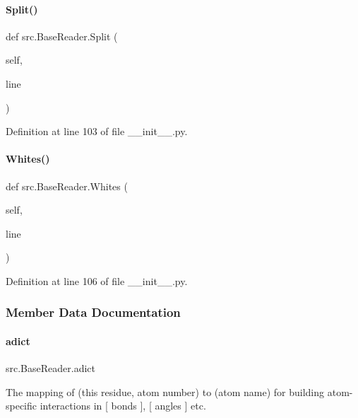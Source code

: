 \paragraph{\texorpdfstring{Split()}{Split()}}
{\footnotesize\ttfamily def src.\+Base\+Reader.\+Split (\begin{DoxyParamCaption}\item[{}]{self,  }\item[{}]{line }\end{DoxyParamCaption})}



Definition at line 103 of file \+\_\+\+\_\+init\+\_\+\+\_\+.\+py.

\mbox{\label{classsrc_1_1BaseReader_a749b5836039a78456d72f184d977568e}} 
\paragraph{\texorpdfstring{Whites()}{Whites()}}
{\footnotesize\ttfamily def src.\+Base\+Reader.\+Whites (\begin{DoxyParamCaption}\item[{}]{self,  }\item[{}]{line }\end{DoxyParamCaption})}



Definition at line 106 of file \+\_\+\+\_\+init\+\_\+\+\_\+.\+py.



\subsubsection{Member Data Documentation}
\mbox{\label{classsrc_1_1BaseReader_ad345ca9b16960d07f927d84f823aa75a}} 
\paragraph{\texorpdfstring{adict}{adict}}
{\footnotesize\ttfamily src.\+Base\+Reader.\+adict}



The mapping of (this residue, atom number) to (atom name) for building atom-\/specific interactions in \mbox{[} bonds \mbox{]}, \mbox{[} angles \mbox{]} etc. 



